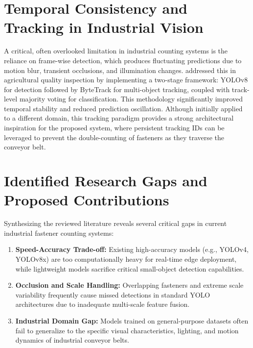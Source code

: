 \section{Temporal Consistency and Tracking in Industrial Vision}
A critical, often overlooked limitation in industrial counting systems is the reliance on frame-wise detection, which produces fluctuating predictions due to motion blur, transient occlusions, and illumination changes. \cite{park2026twostagedetectiontrackingframeworkstable} addressed this in agricultural quality inspection by implementing a two-stage framework: YOLOv8 for detection followed by ByteTrack for multi-object tracking, coupled with track-level majority voting for classification. This methodology significantly improved temporal stability and reduced prediction oscillation. Although initially applied to a different domain, this tracking paradigm provides a strong architectural inspiration for the proposed system, where persistent tracking IDs can be leveraged to prevent the double-counting of fasteners as they traverse the conveyor belt.

\section{Identified Research Gaps and Proposed Contributions}
Synthesizing the reviewed literature reveals several critical gaps in current industrial fastener counting systems:
\begin{enumerate}
    \item \textbf{Speed-Accuracy Trade-off:} Existing high-accuracy models (e.g., YOLOv4, YOLOv8x) are too computationally heavy for real-time edge deployment, while lightweight models sacrifice critical small-object detection capabilities.
    \item \textbf{Occlusion and Scale Handling:} Overlapping fasteners and extreme scale variability frequently cause missed detections in standard YOLO architectures due to inadequate multi-scale feature fusion.
    \item \textbf{Industrial Domain Gap:} Models trained on general-purpose datasets often fail to generalize to the specific visual characteristics, lighting, and motion dynamics of industrial conveyor belts.
\end{enumerate}

